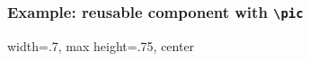
\begin{frame}
    \frametitle{Example: reusable component with \texttt{\textbackslash pic}}

    \begin{adjustbox}{width=.7\linewidth, max height=.75\textheight, center}
        
    \end{adjustbox}

\end{frame}
